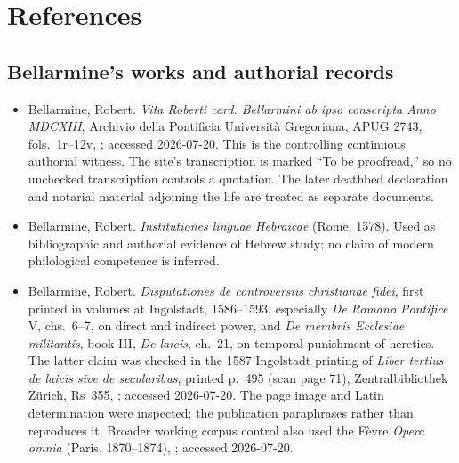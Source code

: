 \section{References}
\label{sec:bellarmine-references}

\begingroup
\setlength{\parskip}{0.15em}
\titlespacing*{\subsection}{0pt}{1.35ex}{0.45ex}

\subsection{Bellarmine's works and authorial records}

\begin{itemize}
\item Bellarmine, Robert.  \emph{Vita Roberti card. Bellarmini ab ipso
conscripta Anno MDCXIII}, Archivio della Pontificia Università Gregoriana,
APUG 2743, fols.~1r--12v,
; accessed 2026-07-20.  This is the controlling
continuous authorial witness.  The site's transcription is marked ``To be
proofread,'' so no unchecked transcription controls a quotation.  The later
deathbed declaration and notarial material adjoining the life are treated as
separate documents.

\item Bellarmine, Robert.  \emph{Institutiones linguae Hebraicae} (Rome,
1578).  Used as bibliographic and authorial evidence of Hebrew study; no claim
of modern philological competence is inferred.

\item Bellarmine, Robert.  \emph{Disputationes de controversiis christianae
fidei}, first printed in volumes at Ingolstadt, 1586--1593, especially
\emph{De Romano Pontifice} V, chs.~6--7, on direct and indirect power, and
\emph{De membris Ecclesiae militantis}, book III, \emph{De laicis}, ch.~21,
on temporal punishment of heretics.  The latter claim was checked in the 1587
Ingolstadt printing of \emph{Liber tertius de laicis sive de secularibus},
printed p.~495 (scan page 71), Zentralbibliothek Zürich, Rs~355,
;
accessed 2026-07-20.  The page image and Latin determination were inspected;
the publication paraphrases rather than reproduces it.  Broader working corpus
control also used the Fèvre \emph{Opera omnia} (Paris, 1870--1874),
; accessed 2026-07-20.


\end{itemize}
